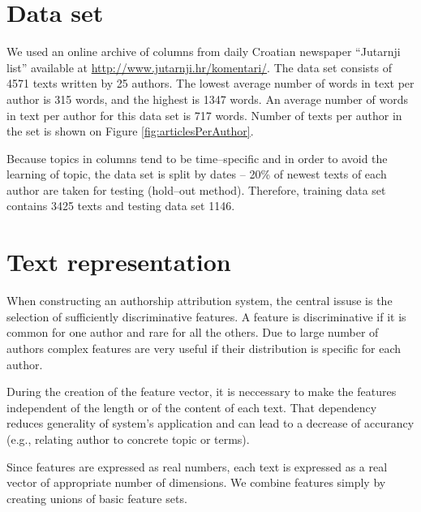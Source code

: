 \documentclass[11pt,english]{article}
\begin{document}
\begin{multicols}{2}
\section{Data set}
\label{sec:podatci}
We used an online archive of columns from daily Croatian newspaper ``Jutarnji
list'' available at \url{http://www.jutarnji.hr/komentari/}. The data set
consists of 4571 texts written by 25 authors. The lowest average number of words
in text per author is 315 words, and the highest is 1347 words. An average number
of words in text per author for this data set is 717 words. Number of texts per
author in the set is shown on Figure \ref{fig:articlesPerAuthor}.

Because topics in columns tend to be time--specific and in order to avoid the
learning of topic, the data set is split by dates -- 20\% of newest texts of
each author are taken for testing (hold--out method). Therefore, training data
set contains 3425 texts and testing data set 1146.

\begin{minipage}{0.8\linewidth}
\vspace{10pt}
\centerline{\resizebox{1.4\linewidth}{!}{}}%
%
\label{fig:articlesPerAuthor}
\end{minipage}

\section{Text representation}
When constructing an authorship attribution system, the central issuse is the selection of sufficiently discriminative features. A feature is
discriminative if it is common for one author and rare for all the others. Due to large number of authors complex features are very useful if their
distribution is specific for each author. %


During the creation of the feature vector, it is neccessary to make the
features independent of the length or of the content of each text. That
dependency reduces generality of system's application and can lead to a decrease of accurancy
(e.g., relating author to concrete topic or terms).

Since features are expressed as real numbers, each text is expressed as a real
vector of appropriate number of dimensions. We combine features simply by creating unions of basic feature sets.


\end{multicols}
\end{document}
